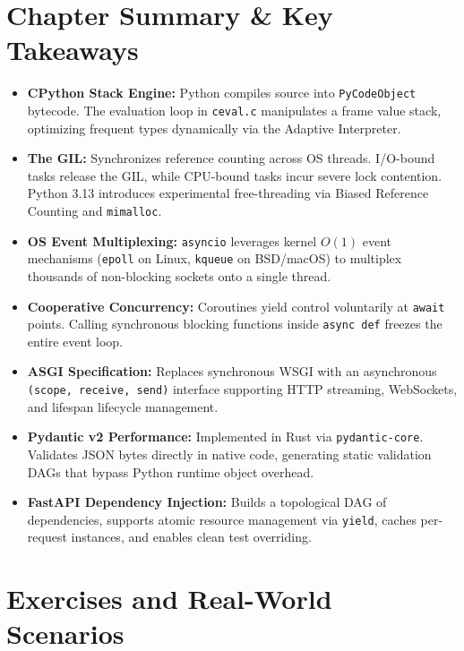 \section{Chapter Summary \& Key Takeaways}

\begin{itemize}[leftmargin=15pt]
  \item \textbf{CPython Stack Engine:} Python compiles source into \texttt{PyCodeObject} bytecode. The evaluation loop in \texttt{ceval.c} manipulates a frame value stack, optimizing frequent types dynamically via the Adaptive Interpreter.
  \item \textbf{The GIL:} Synchronizes reference counting across OS threads. I/O-bound tasks release the GIL, while CPU-bound tasks incur severe lock contention. Python 3.13 introduces experimental free-threading via Biased Reference Counting and \texttt{mimalloc}.
  \item \textbf{OS Event Multiplexing:} \texttt{asyncio} leverages kernel $O(1)$ event mechanisms (\texttt{epoll} on Linux, \texttt{kqueue} on BSD/macOS) to multiplex thousands of non-blocking sockets onto a single thread.
  \item \textbf{Cooperative Concurrency:} Coroutines yield control voluntarily at \texttt{await} points. Calling synchronous blocking functions inside \texttt{async def} freezes the entire event loop.
  \item \textbf{ASGI Specification:} Replaces synchronous WSGI with an asynchronous \texttt{(scope, receive, send)} interface supporting HTTP streaming, WebSockets, and lifespan lifecycle management.
  \item \textbf{Pydantic v2 Performance:} Implemented in Rust via \texttt{pydantic-core}. Validates JSON bytes directly in native code, generating static validation DAGs that bypass Python runtime object overhead.
  \item \textbf{FastAPI Dependency Injection:} Builds a topological DAG of dependencies, supports atomic resource management via \texttt{yield}, caches per-request instances, and enables clean test overriding.
\end{itemize}

\section{Exercises and Real-World Scenarios}


